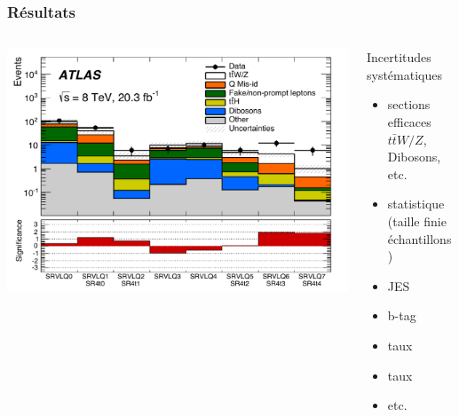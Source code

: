 \begin{frame}
\frametitle{Résultats}

\begin{columns}
\begin{column}{0.7\textwidth}
\begin{center}
\includegraphics[width=1\textwidth]{Figures/FourTops/ExpectedBackgroundObeservedCategories.pdf}
\end{center}
\end{column}
\begin{column}{0.45\textwidth}
\begin{small}
\begin{maliste}
\item Incertitudes syst\'ematiques
\begin{itemize}
\item sections efficaces $t\bar{t}W/Z$, Dibosons, etc.
\item statistique (taille finie \'echantillons)
\item JES
\item b-tag
\item taux 
\item taux 
\item etc.
\end{itemize}
\end{maliste}
\end{small}
\end{column}
\end{columns}
\end{frame}

